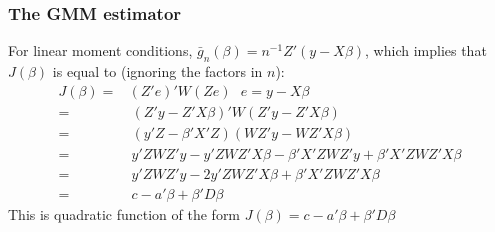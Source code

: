 \documentclass[a4paper,twoside,11pt]{article}
\begin{document}
\subsubsection{The GMM estimator}
For linear moment conditions, $\bar g_n(\beta) = n^{-1}Z'(y-X\beta)$, which implies that $J(\beta)$ is equal to (ignoring the factors in $n$):
\begin{equation*}
\begin{aligned}
J(\beta) =& (Z'e)'W(Ze) \ \ \ e = y-X\beta \\
=& \ (Z'y - Z'X\beta)'W(Z'y - Z' X \beta) \\
=& \ (y'Z - \beta' X'Z)(WZ' y-WZ'X\beta) \\
=& \ y'ZWZ' y - y'ZWZ'X\beta - \beta'X'ZWZ' y + \beta'X'ZWZ' X \beta \\
=& \ y'ZWZ'y - 2y' ZWZ'X\beta + \beta'X'ZWZ'X \beta \\
=& \ c- a'\beta + \beta'D \beta
\end{aligned} 
\end{equation*}
This is quadratic function of the form $J(\beta) = c- a'\beta + \beta'D \beta$
\end{document}
